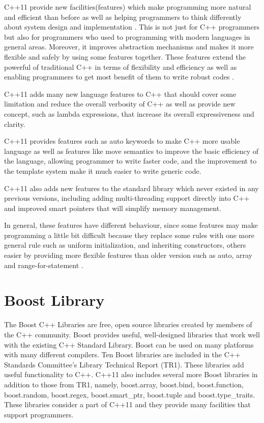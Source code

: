 \documentclass[11pt,]{report}
\begin{document}
C++11 provide new facilities(features) which make programming more \linebreak natural and efficient than before as well as helping programmers to think \linebreak differently about system design and implementation \cite{Stroustrup:2012:Cpp11}. This is not just for C++ programmers but also for programmers who used to programming with modern languages in general areas. Moreover, it improves abstraction \linebreak mechanisms and makes it more flexible and safely by using some features \linebreak together. These features extend the powerful of traditional C++ in terms of flexibility and efficiency as well as enabling programmers to get most benefit of them to write robust codes \cite{ISO:2011:Cpplanguage}.

C++11 adds many new language features to C++ that should cover some limitation and reduce the overall verbosity of C++ as well as provide new concept, such as lambda expressions, that increase its overall expressiveness and clarity.

C++11 provides features such as auto keywords to make C++ more usable language as well as features like move semantics to improve the basic efficiency of the language, allowing programmer to write faster code, and the improvement to the template system make it much easier to write generic code\cite{Stroustrup:2005:Cpp}.

C++11 also adds new features to the standard library which never existed in any previous versions, including adding multi-threading support directly into C++ and improved smart pointers that will simplify memory management. 

In general, these features have different behaviour, since some features may make programming a little bit difficult because they replace some rules with one more general rule such as uniform initialization,  and inheriting constructors, others easier by providing more flexible features than older version such as auto, array and range-for-statement \cite{Stroustrup:2012:Cpp11}.

	

\section{Boost Library}
\label{section: Boost Library}
The Boost C++ Libraries are free, open source libraries created by members of the C++ community. Boost provides useful, well-designed libraries that work well with the existing C++ Standard Library. Boost can be used on many platforms with many different compilers. Ten Boost libraries are included in the C++ Standards Committee's Library Technical Report (TR1). These \linebreak libraries add useful functionality to C++.  C++11 also includes several more Boost libraries in addition to those from TR1, namely, boost.array, boost.bind, boost.function, boost.random, boost.regex, boost.smart\_ptr, boost.tuple and boost.type\_traits. These libraries consider a part of C++11 and they provide many facilities that support programmers\cite{Deitel:2012:CPP}.
\end{document}
